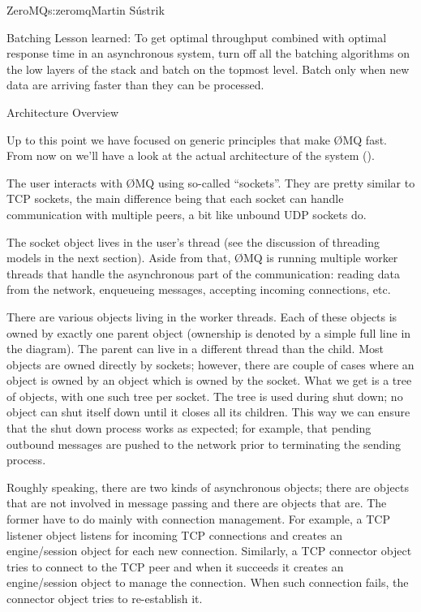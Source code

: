 \begin{aosachapter}{ZeroMQ}{s:zeromq}{Martin S\'{u}strik}
\begin{aosasect1}{Batching}
Lesson learned: To get optimal throughput combined with optimal
response time in an asynchronous system, turn off all the batching
algorithms on the low layers of the stack and batch on the topmost
level. Batch only when new data are arriving faster than they can be
processed.

\end{aosasect1}

\begin{aosasect1}{Architecture Overview}

Up to this point we have focused on generic principles that make {\O}MQ
fast. From now on we'll have a look at the actual architecture of the
system ().


The user interacts with {\O}MQ using so-called ``sockets''. They are pretty
similar to TCP sockets, the main difference being that each socket can
handle communication with multiple peers, a bit like unbound UDP
sockets do.

The socket object lives in the user's thread (see the discussion of
threading models in the next section). Aside from that, {\O}MQ is running
multiple worker threads that handle the asynchronous part of the
communication: reading data from the network, enqueueing messages,
accepting incoming connections, etc.

There are various objects living in the worker threads. Each of these
objects is owned by exactly one parent object (ownership is denoted by 
a simple full line in the
diagram). The parent can live in a
different thread than the child. Most objects are owned directly by
sockets; however, there are couple of cases where an object is owned
by an object which is owned by the socket. What we get is a tree of
objects, with one such tree per socket. The tree is used during 
shut down; no object can shut itself down until it closes all its
children. This way we can ensure that the shut down process works as
expected; for example, that pending outbound messages are pushed to
the network prior to terminating the sending process.

Roughly speaking, there are two kinds of asynchronous objects; there
are objects that are not involved in message passing and there are
objects that are.  
The former have to do mainly with connection management. For example,
a TCP listener object listens for incoming TCP connections and creates
an engine/session object for each new connection. Similarly, a TCP
connector object tries to connect to the TCP peer and when it succeeds
it creates an engine/session object to manage the connection. When
such connection fails, the connector object tries to re-establish it.


\end{aosasect1}
\end{aosachapter}

